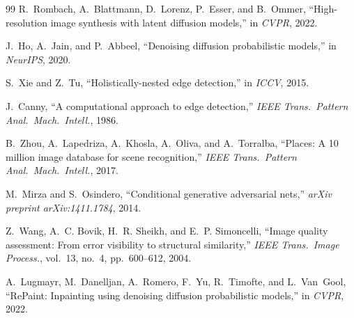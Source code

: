 \documentclass[conference]{IEEEtran}
\begin{document}
\begin{thebibliography}{99}
R.~Rombach, A.~Blattmann, D.~Lorenz, P.~Esser, and B.~Ommer,
``High-resolution image synthesis with latent diffusion models,''
in \emph{CVPR}, 2022.

J.~Ho, A.~Jain, and P.~Abbeel,
``Denoising diffusion probabilistic models,'' in \emph{NeurIPS}, 2020.

S.~Xie and Z.~Tu,
``Holistically-nested edge detection,'' in \emph{ICCV}, 2015.

J.~Canny,
``A computational approach to edge detection,''
\emph{IEEE Trans.\ Pattern Anal.\ Mach.\ Intell.}, 1986.

B.~Zhou, A.~Lapedriza, A.~Khosla, A.~Oliva, and A.~Torralba,
``Places: A 10 million image database for scene recognition,''
\emph{IEEE Trans.\ Pattern Anal.\ Mach.\ Intell.}, 2017.

M.~Mirza and S.~Osindero,
``Conditional generative adversarial nets,''
\emph{arXiv preprint arXiv:1411.1784}, 2014.

Z.~Wang, A.~C. Bovik, H.~R. Sheikh, and E.~P. Simoncelli,
``Image quality assessment: From error visibility to structural similarity,''
\emph{IEEE Trans.\ Image Process.}, vol.~13, no.~4, pp.~600--612, 2004.

A.~Lugmayr, M.~Danelljan, A.~Romero, F.~Yu, R.~Timofte, and L.~Van~Gool,
``RePaint: Inpainting using denoising diffusion probabilistic models,''
in \emph{CVPR}, 2022.

\end{thebibliography}
\end{document}
